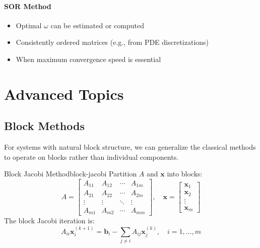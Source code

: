 \paragraph{SOR Method}
\begin{itemize}
    \item Optimal $\omega$ can be estimated or computed
    \item Consistently ordered matrices (e.g., from PDE discretizations)
    \item When maximum convergence speed is essential
\end{itemize}

\section{Advanced Topics}

\subsection{Block Methods}

For systems with natural block structure, we can generalize the classical methods to operate on blocks rather than individual components.

\begin{definition}{Block Jacobi Method}{block-jacobi}
    Partition $A$ and $\mathbf{x}$ into blocks:
    \begin{equation}
        A = \begin{bmatrix}
            A_{11} & A_{12} & \cdots & A_{1m} \\
            A_{21} & A_{22} & \cdots & A_{2m} \\
            \vdots & \vdots & \ddots & \vdots \\
            A_{m1} & A_{m2} & \cdots & A_{mm}
        \end{bmatrix}, \quad
        \mathbf{x} = \begin{bmatrix}
            \mathbf{x}_1 \\ \mathbf{x}_2 \\ \vdots \\ \mathbf{x}_m
        \end{bmatrix}
    \end{equation}
    The block Jacobi iteration is:
    \begin{equation}
        A_{ii}\mathbf{x}_i^{(k+1)} = \mathbf{b}_i - \sum_{j \neq i} A_{ij}\mathbf{x}_j^{(k)}, \quad i = 1, \ldots, m
    \end{equation}
\end{definition}

